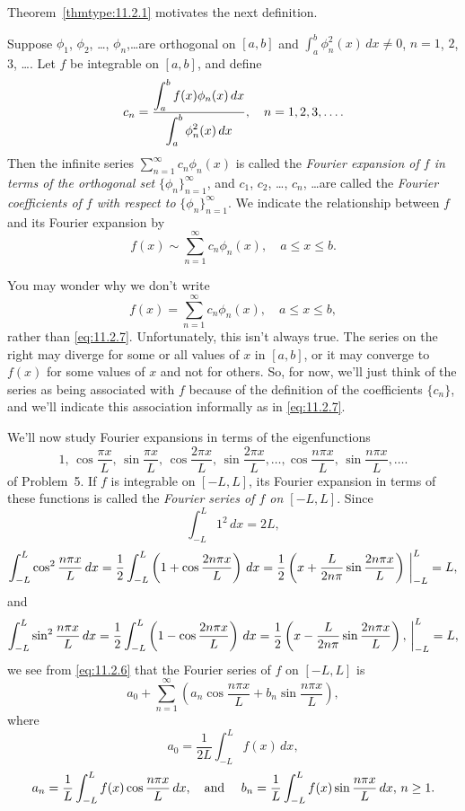 Theorem~\ref{thmtype:11.2.1} motivates the next definition.

\begin{definition}
  \color{blue}
  \label{thmtype:11.2.2} \rm Suppose $\phi_{1}$, $\phi_{2}$, \dots, $\phi_{n}$,\dots are orthogonal
  on $[a,b]$ and $\int_{a}^{b}\phi_{n}^{2}(x)\,dx\ne0$, $n=1$, $2$, $3$, \dots. Let $f$ be
  integrable on $[a,b]$, and define
  \begin{equation}
    \label{eq:11.2.6}c_{n}=\frac{\displaystyle\int_{a}^{b}f(x)\phi_{n}(x)\,dx}{\displaystyle\int_{a}^{b}\phi_{n}^{2}(x)\,dx},\quad n=1,2,3,\dots.
  \end{equation}
  Then the infinite series $\sum_{n=1}^{\infty}c_{n}\phi_{n}(x)$ is called the {\color{blue}\it
  Fourier expansion of $f$ in terms of the orthogonal set\/} $\{\phi_{n}\}_{n=1}^{\infty}$, and
  $c_{1}$, $c_{2}$, \dots, $c_{n}$, \dots are called the {\color{blue}\it Fourier coefficients of
  $f$\/ with respect to\/} $\{\phi_{n}\}_{n=1}^{\infty}$. We indicate the relationship between $f$
  and its Fourier expansion by
  \begin{equation}
    \label{eq:11.2.7}f(x)\sim\sum_{n=1}^{\infty}c_{n}\phi_{n}(x),\quad a\le x\le b.
  \end{equation}
\end{definition}

You may wonder why we don't write
\[
  f(x)=\sum_{n=1}^{\infty}c_{n}\phi_{n}(x),\quad a\le x\le b,
\]
rather than \eqref{eq:11.2.7}. Unfortunately, this isn't always true. The series on the right may
diverge for some or all values of $x$ in $[a,b]$, or it may converge to $f(x)$ for some values of
$x$ and not for others. So, for now, we'll just think of the series as being associated with $f$
because of the definition of the coefficients $\{c_{n}\}$, and we'll indicate this association
informally as in \eqref{eq:11.2.7}.

\newpage
{}

\noindent
We'll now study Fourier expansions in terms of the eigenfunctions
\[
  1,\,\cos\frac{\pi x}{L},\,\sin\frac{\pi x}{L}, \,\cos\frac{2\pi x}{L},\,\sin\frac{2\pi x}{L},\dots, \cos\frac{n\pi x}{L},\,\sin\frac{n\pi x}{L},\dots.
\]
of Problem~5. If $f$ is integrable on $[-L,L]$, its Fourier expansion in terms of these functions is
called the {\color{blue}\it Fourier series of $f$ on $[-L,L]$\/}. Since
\[
  \int_{-L}^{L}1^{2}\,dx=2L,
\]
\[
  \int_{-L}^{L}\cos^{2}\frac{n\pi x}{L}\,dx= \frac{1}{2}\int_{-L}^{L}\left(1+\cos\frac{2n\pi x}{L}\right)\,dx= \frac{1}{2}\left(x+\frac{L}{2n\pi}\sin\frac{2n\pi x}{L}\right) \,\bigg|_{-L}^{L}=L,
\]
and
\[
  \int_{-L}^{L}\sin^{2}\frac{n\pi x}{L}\,dx= \frac{1}{2}\int_{-L}^{L}\left(1-\cos\frac{2n\pi x}{L}\right)\,dx= \frac{1}{2}\left(x-\frac{L}{2n\pi}\sin\frac{2n\pi x}{L}\right), \,\bigg|_{-L}^{L}=L,
\]
we see from \eqref{eq:11.2.6} that the Fourier series of $f$ on $[-L,L]$ is
\[
  a_{0}+\sum_{n=1}^{\infty}\left(a_{n}\cos\frac{n\pi x}{L}+b_{n}\sin\frac{n\pi x}{L}\right),
\]
where
\[
  a_{0}=\frac{1}{2L}\int_{-L}^{L}f(x)\,dx,
\]
\[
  a_{n}=\frac{1}{L}\int_{-L}^{L}f(x)\cos\frac{n\pi x}{L}\,dx,\mbox{\quad and \quad}b_{n}=\frac{1}{L}\int_{-L}^{L}f(x)\sin\frac{n\pi x}{L}\,dx,\,n\ge1.
\]

